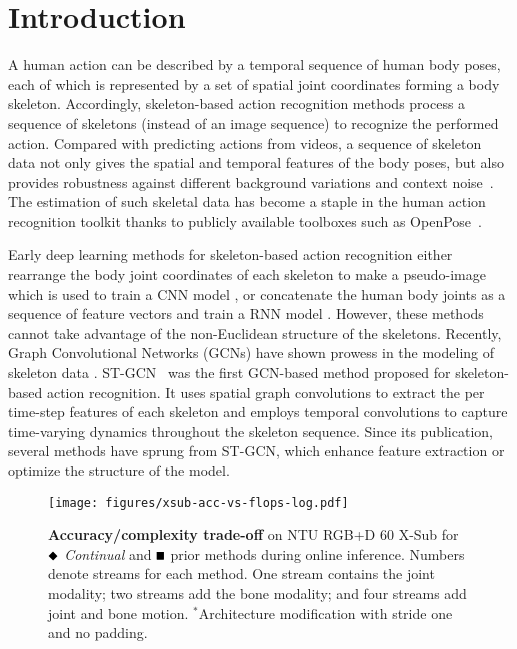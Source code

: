 \documentclass[journal]{IEEEtran}
\newcommand\ssquare[0]{\mathbin{\vcenter{\hbox{\scalebox{0.75}{$\blacksquare$}}}}}
\newcommand\sdiamond[0]{\mathbin{\vcenter{\hbox{\rotatebox{45}{\scalebox{0.70}{$\blacksquare$}}}}}}
\theoremstyle{definition}
\begin{document}
\maketitle


\section{Introduction}\label{sec:introduction}

A human action can be described by a temporal sequence of human body poses, each of which is represented by a set of spatial joint coordinates forming a body skeleton.
Accordingly, skeleton-based action recognition methods process a sequence of skeletons (instead of an image sequence) to recognize the performed action.  
Compared with predicting actions from videos, a sequence of skeleton data not only gives the spatial and temporal features of the body poses, but also provides robustness against different background variations and context noise~\cite{han2017space}. 
The estimation of such skeletal data has become a staple in the human action recognition toolkit thanks to publicly available toolboxes such as OpenPose~\cite{cao2019openpose}. 


Early deep learning methods for skeleton-based action recognition either rearrange the body joint coordinates of each skeleton to make a pseudo-image which is used to train a CNN model \cite{kim2017interpretable,liu2017enhanced,naveenkumar2020deep}, or concatenate the human body joints as a sequence of feature vectors and train a RNN model \cite{liu2016spatio,zhang2017view, nikpour2023spatio}. 
However, these methods cannot take advantage of the non-Euclidean structure of the skeletons.
Recently, Graph Convolutional Networks (GCNs) have shown prowess in the modeling of skeleton data \cite{heidari2022gcnChapter}. 
ST-GCN~\cite{yan2018spatial} was the first GCN-based method proposed for skeleton-based action recognition. It uses spatial graph convolutions to extract the per time-step features of each skeleton and employs temporal convolutions to capture time-varying dynamics throughout the skeleton sequence. 
Since its publication, several methods have sprung from ST-GCN, which enhance feature extraction or optimize the structure of the model.  


\begin{figure}[t]
    \centering
    \texttt{[image: figures/xsub-acc-vs-flops-log.pdf]}
    \caption{
        \textbf{Accuracy/complexity trade-off} on NTU RGB+D 60 X-Sub for $\sdiamond$ \textit{Continual} and $\ssquare$ prior methods during online inference.
        Numbers denote streams for each method.
        One stream contains the joint modality; two streams add the bone modality; and four streams add joint and bone motion.
        $^*$Architecture modification with stride one and no padding.
    }
    \label{fig:test-acc-vs-flops}
\end{figure}
\end{document}
